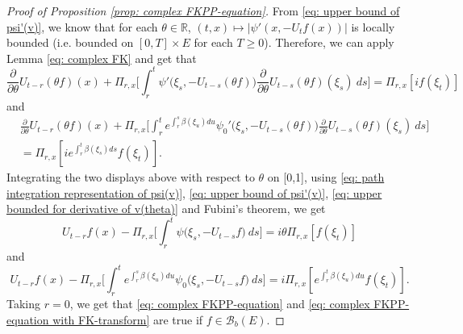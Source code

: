 \begin{proof}[Proof of Proposition \ref{prop: complex FKPP-equation}]
    From \eqref{eq: upper bound of psi'(v)}, we know that for each $\theta\in \mathbb R$, $(t,x) \mapsto |\psi'(x,-U_tf(x))|$ is locally bounded (i.e. bounded on $[0,T]\times E$ for each $T \geq 0$).
    Therefore, we can apply Lemma \ref{eq: complex FK} and get that
\[
    \frac{\partial}{\partial \theta} U_{t-r}(\theta f)(x) + \Pi_{r,x} \Big[\int_r^t \psi'\big(\xi_s,- U_{t-s}(\theta f)\big)\frac{\partial}{\partial \theta} U_{t-s}(\theta f)(\xi_s)~ds\Big]
    = \Pi_{r,x} [i f(\xi_t)]
\]
    and
\begin{align}
    &\frac{\partial}{\partial \theta} U_{t-r}(\theta f)(x) + \Pi_{r,x} \Big[\int_r^t e^{\int_r^s \beta(\xi_u)du}\psi_0'\big(\xi_s,- U_{t-s}(\theta f)\big)\frac{\partial}{\partial \theta} U_{t-s}(\theta f)(\xi_s)~ds\Big]\\
    &= \Pi_{r,x} [i e^{\int_r^t \beta(\xi_s)ds}f(\xi_t)].
\end{align}
    Integrating the two displays above with respect to $\theta$  on [0,1], using \eqref{eq: path integration representation of psi(v)}, \eqref{eq: upper bound of psi'(v)}, \eqref{eq: upper bounded for derivative of v(theta)} and Fubini's theorem, we get
\begin{equation}
    U_{t-r}f(x) - \Pi_{r,x} \Big[\int_r^t \psi\big(\xi_s,-U_{t-s}f\big) ~ds\Big]
    = i\theta \Pi_{r,x} [f(\xi_t)]
\end{equation}
    and
\begin{equation}
    U_{t-r}f(x) - \Pi_{r,x} \Big[\int_r^t e^{\int_r^s \beta(\xi_u)du} \psi_0\big(\xi_s,- U_{t-s}f\big) ~ds\Big]
    = i\Pi_{r,x} [e^{\int_r^t\beta(\xi_u)du}f(\xi_t)].
\end{equation}
    Taking $r = 0$, we get that \eqref{eq: complex FKPP-equation} and \eqref{eq: complex FKPP-equation with FK-transform} are true if $f\in \mathcal B_b(E)$.


\end{proof}
